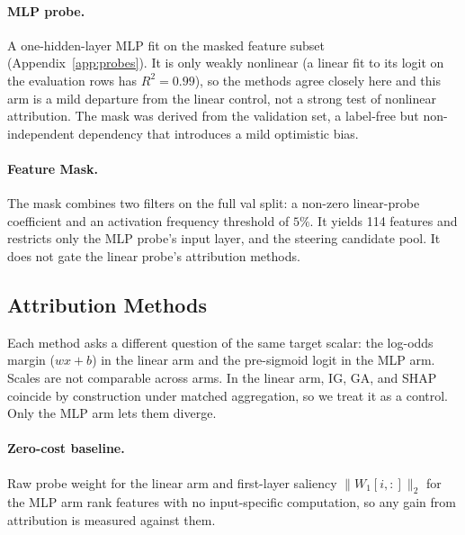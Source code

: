 \paragraph{MLP probe.} A one-hidden-layer MLP fit on the masked feature subset (Appendix~\ref{app:probes}). It is only weakly nonlinear (a linear fit to its logit on the evaluation rows has $R^2=0.99$), so the methods agree closely here and this arm is a mild departure from the linear control, not a strong test of nonlinear attribution. The mask was derived from the validation set, a label-free but non-independent dependency that introduces a mild optimistic bias.

\paragraph{Feature Mask.} The mask combines two filters on the full val split: a non-zero linear-probe coefficient and an activation frequency threshold of $5\%$. It yields 114 features and restricts only the MLP probe’s input layer, and the steering candidate pool. It does not gate the linear probe’s attribution methods.

\subsection{Attribution Methods}
Each method asks a different question of the same target scalar: the log-odds margin ($wx+b$) in the linear arm and the pre-sigmoid logit in the MLP arm. Scales are not comparable across arms. In the linear arm, IG, GA, and SHAP coincide by construction under matched aggregation, so we treat it as a control. Only the MLP arm lets them diverge.

\paragraph{Zero-cost baseline.} Raw probe weight for the linear arm and first-layer saliency $\|W_1[i,:]\|_2$ for the MLP arm rank features with no input-specific computation, so any gain from attribution is measured against them.

